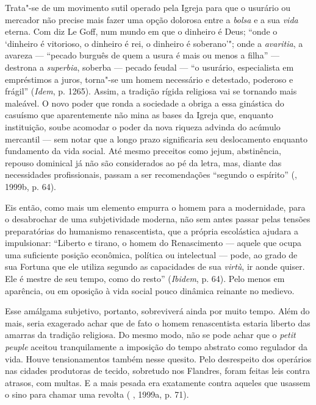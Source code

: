 Trata"-se de um movimento sutil operado pela Igreja para que o usurário
ou mercador não precise mais fazer uma opção dolorosa entre a
\emph{bolsa} e a sua \emph{vida} eterna. Com diz
Le Goff, num mundo em que o dinheiro é Deus; ``onde o `dinheiro é
vitorioso, o dinheiro é rei, o dinheiro é soberano'"; onde a
\emph{avaritia}, a avareza --- ``pecado burguês de quem a usura é mais ou
menos a filha'' --- destrona a \emph{superbia}, soberba --- pecado feudal
--- ``o usurário, especialista em empréstimos a juros, torna"-se um homem
necessário e detestado, poderoso e frágil'' (\emph{Idem}, p. 1265).
Assim, a tradição rígida religiosa vai se tornando mais maleável. O novo
poder que ronda a sociedade a obriga a essa ginástica do casuísmo que
aparentemente não mina as bases da Igreja que, enquanto instituição,
soube acomodar o poder da nova riqueza advinda do acúmulo mercantil ---
sem notar que a longo prazo significaria seu deslocamento enquanto
fundamento da vida social. Até mesmo preceitos como jejum, abstinência,
repouso dominical já não são considerados ao pé da letra, mas, diante
das necessidades profissionais, passam a ser recomendações ``segundo o
espírito'' (, 1999b, p. 64).

Eis então, como mais um elemento empurra o homem para a modernidade,
para o desabrochar de uma subjetividade moderna, não sem antes passar
pelas tensões preparatórias do humanismo renascentista, que a própria
escolástica ajudara a impulsionar: ``Liberto e tirano, o homem do
Renascimento --- aquele que ocupa uma suficiente posição econômica,
política ou intelectual --- pode, ao grado de sua Fortuna que ele utiliza
segundo as capacidades de sua \emph{virtù}, ir aonde quiser. Ele é
mestre de seu tempo, como do resto'' (\emph{Ibidem}, p. 64). Pelo menos
em aparência, ou em oposição à vida social pouco dinâmica reinante no
medievo.

Esse amálgama subjetivo, portanto, sobreviverá ainda por muito tempo.
Além do mais, seria exagerado achar que de fato o homem renascentista
estaria liberto das amarras da tradição religiosa. Do mesmo modo, não
se pode achar que o \emph{petit peuple} aceitou tranquilamente a
imposição do tempo abstrato como regulador da vida. Houve tensionamentos
também nesse quesito. Pelo desrespeito dos operários nas cidades
produtoras de tecido, sobretudo nos Flandres, foram feitas leis contra
atrasos, com multas. E a mais pesada era exatamente contra aqueles que
usassem o sino para chamar uma revolta ( , 1999a, p. 71).

